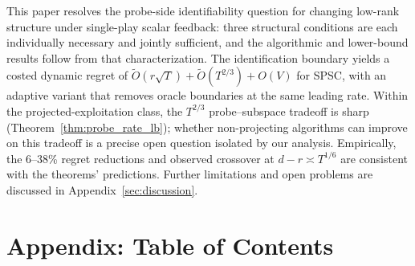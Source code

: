 \documentclass{article}
\begin{document}
This paper resolves the probe-side identifiability question for changing low-rank structure under single-play scalar feedback: three structural conditions are each individually necessary and jointly sufficient, and the algorithmic and lower-bound results follow from that characterization.
The identification boundary yields a costed dynamic regret of $\widetilde{O}(r\sqrt{T}) + \widetilde{O}(T^{2/3}) + O(V)$ for SPSC, with an adaptive variant that removes oracle boundaries at the same leading rate.
Within the projected-exploitation class, the $T^{2/3}$ probe--subspace tradeoff is sharp (Theorem~\ref{thm:probe_rate_lb}); whether non-projecting algorithms can improve on this tradeoff is a precise open question isolated by our analysis.
Empirically, the 6--38\% regret reductions and observed crossover at $d - r \asymp T^{1/6}$ are consistent with the theorems' predictions.
Further limitations and open problems are discussed in Appendix~\ref{sec:discussion}.


\newpage



\newpage
\appendix

  \section*{Appendix: Table of Contents}
  \label{app:toc}

  \begingroup
  \hypersetup{linkcolor=blue}

  \newcommand{\tocentry}[3]{%
    \noindent\textbf{#1.}\;\hyperref[#2]{#3}\dotfill\hyperref[#2]{p.\,\pageref*{#2}}\par\vspace{2pt}%
  }
  \newcommand{\tocsubentry}[3]{%
    \noindent\hspace{1.2em}#1\;\hyperref[#2]{#3}\dotfill\hyperref[#2]{p.\,\pageref*{#2}}\par\vspace{1pt}%
  }
\end{document}
